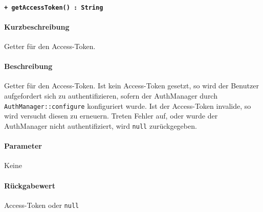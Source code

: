 \paragraph{\texttt{+ getAccessToken() : String}}\label{AP_AuthManager_getAccessToken}%
\paragraph*{Kurzbeschreibung}
Getter für den Access-Token.
\paragraph*{Beschreibung}
Getter für den Access-Token.
Ist kein Access-Token gesetzt, so wird der Benutzer aufgefordert sich zu authentifizieren, sofern der AuthManager durch \verb#AuthManager::configure# konfiguriert wurde.
Ist der Access-Token invalide, so wird versucht diesen zu erneuern.
Treten Fehler auf, oder wurde der AuthManager nicht authentifiziert, wird \verb#null# zurückgegeben.
\paragraph*{Parameter}
Keine
\paragraph*{Rückgabewert}
Access-Token oder \verb#null#
